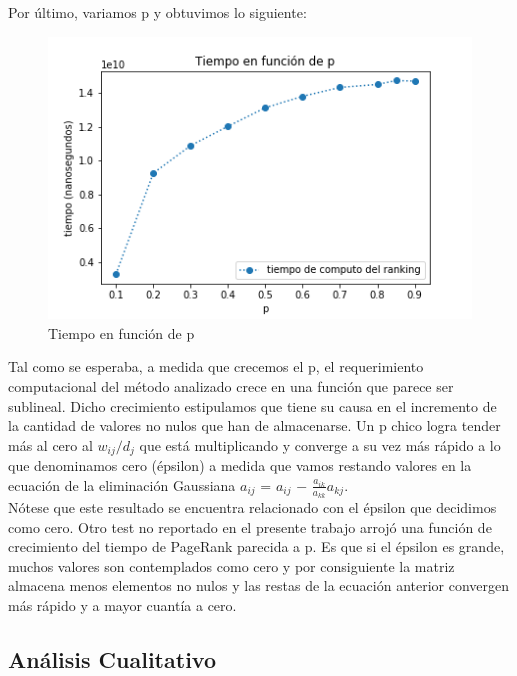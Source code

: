 Por último, variamos p y obtuvimos lo siguiente:

\begin{figure}[H]
   \begin{center}
     \includegraphics{img/tiempo_p.png} 
  \end{center}
\caption{Tiempo en función de p} \label{fig:exp1-p}
\end{figure}


Tal como se esperaba, a medida que crecemos el p, el requerimiento computacional del método analizado crece en una función que parece ser sublineal. Dicho crecimiento estipulamos que tiene su causa en el incremento de la cantidad de valores no nulos que han de almacenarse. Un p chico logra tender más al cero al $w_{ij}/d_{j}$ que está multiplicando y converge a su vez más rápido a lo que denominamos cero (épsilon) a medida que vamos restando valores en la ecuación de la eliminación Gaussiana $a_{ij}$ = $a_{ij}$ $-$ $\frac{a_{ik}}{a_{kk}} a_{kj}$. \\

Nótese que este resultado se encuentra relacionado con el épsilon que decidimos como cero. Otro test no reportado en el presente trabajo arrojó una función de crecimiento del tiempo de PageRank parecida a p. Es que si el épsilon es grande, muchos valores son contemplados como cero y por consiguiente la matriz almacena menos elementos no nulos y las restas de la ecuación anterior convergen más rápido y a mayor cuantía a cero. \\

\newpage

\subsection{Análisis Cualitativo}

